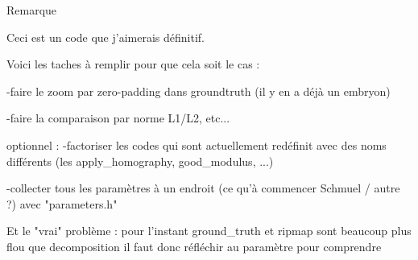 Remarque

Ceci est un code que j’aimerais définitif.


Voici les taches à remplir pour que cela soit le cas :

	-faire le zoom par zero-padding dans groundtruth (il y en a déjà un embryon)
	
	-faire la comparaison par norme L1/L2, etc...
	
	
	
optionnel :
	-factoriser les codes qui sont actuellement redéfinit avec des noms différents (les apply_homography, good_modulus, ...) 
	
	-collecter tous les paramètres à un endroit (ce qu'à commencer Schmuel / autre ?) avec "parameters.h"
	
	
	
Et le "vrai" problème :
	pour l'instant ground_truth et ripmap sont beaucoup plus flou que decomposition
	il faut donc réfléchir au paramètre pour comprendre